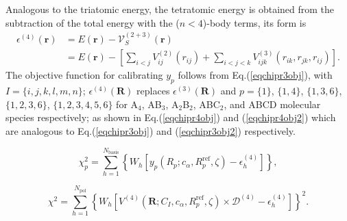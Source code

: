 \documentclass[12pt]{article}
\begin{document}
Analogous to the triatomic energy, the tetratomic energy is obtained from the subtraction of the total energy with the ($n<4$)-body terms, its form is
\begin{equation}
    \begin{split}
        \epsilon^{(4)}(\mathbf{r}) & =  E(\mathbf{r}) - \mathcal{V}_S^{(2+3)}(\mathbf{r}) \\
        & = E(\mathbf{r}) - \left[\sum_{i<j}V_{ij}^{(2)}(r_{ij})+\sum_{i<j<k}V_{ijk}^{(3)}(r_{ik},r_{jk},r_{ij})\right].
    \end{split}
    \label{eqchipr4bodye}
\end{equation}
The objective function for calibrating $y_p$ follows from Eq.(\ref{eqchipr3obj}), with $I = \{i,j,k,l,m,n\}$; $\epsilon^{(4)}(\mathbf{R})$ replaces $\epsilon^{(3)}(\mathbf{R})$ and $p = \{1\}$, $\{1,4\}$, $\{1,3,6\}$, $\{1,2,3,6\}$, $\{1,2,3,4,5,6\}$ for A$_4$, AB$_3$, A$_2$B$_2$, ABC$_2$, and ABCD molecular species respectively; as shown in Eq.(\ref{eqchipr4obj}) and (\ref{eqchipr4obj2}) which are analogous to Eq.(\ref{eqchipr3obj}) and (\ref{eqchipr3obj2}) respectively.

\begin{equation}
    \chi^2_p = \sum^{N_{\text{basis}}}_{h=1}\left\{W_h\left[y_p(R_p;c_\alpha, R_p^{\text{ref}}, \zeta)-\epsilon^{(4)}_h\right]\right\},
    \label{eqchipr4obj}
\end{equation}

\begin{equation}
    \chi^2 = \sum_{h=1}^{N_{\text{pol}}}\left\{W_h\left[V^{(4)}(\mathbf{R}; C_{I}, c_\alpha, R^{\text{ref}}_p, \zeta) \times \mathcal{D}^{(4)} - \epsilon^{(4)}_h\right]\right\}^2.
    \label{eqchipr4obj2}
\end{equation}
\end{document}
